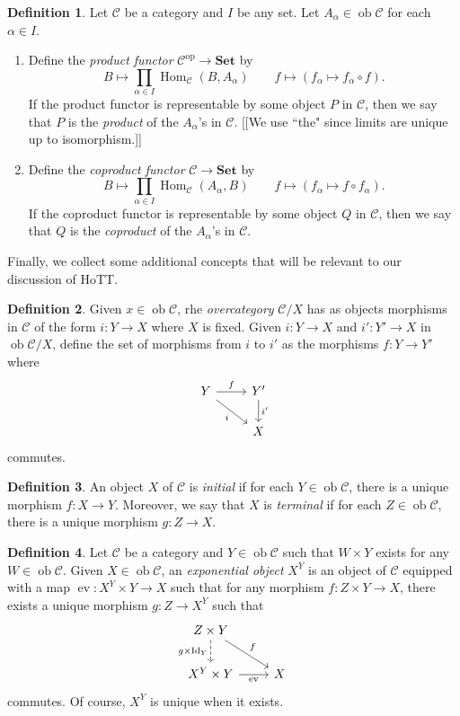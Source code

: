 \documentclass[10pt,letterpaper,cm]{nupset}
\theoremstyle{definition}
\newtheorem{definition}{Definition}[subsection]
\theoremstyle{theorem}
\theoremstyle{remark}
\newcommand{\1}{\mathbf{1}}
\renewcommand{\c}{\mathscr{C}}
\newcommand{\0}{\vec 0}
\DeclareMathOperator{\id}{Id}
\DeclareMathOperator{\op}{op}
\DeclareMathOperator{\ob}{ob}
\DeclareMathOperator{\ev}{ev}
\DeclareMathOperator{\Hom}{Hom}
\begin{document}
\begin{definition} Let $\c$ be a category and $I$ be any set. Let $A_{\alpha} \in \ob \c$ for each $\alpha \in I$.
\begin{enumerate}
\item  Define the \textit{product functor} $\c^{\op} \to \mathbf{Set}$ by $$B \mapsto \prod_{\alpha \in I}\Hom_{\c}(B, A_{\alpha}) \quad \quad f \mapsto (f_{\alpha} \mapsto f_{\alpha} \circ f).$$ If the product functor is representable by some object $P$ in $\c$, then we say that $P$ is the \textit{product} of the $A_{\alpha}$'s in $\c$. {[[We use ``the" since limits are unique up to isomorphism.]]}
\item Define the \textit{coproduct functor} $\c \to \mathbf{Set}$ by $$ B \mapsto \prod_{\alpha \in I} \Hom_{\c}(A_{\alpha}, B) \quad \quad f \mapsto (f_{\alpha} \mapsto f \circ f_{\alpha}).$$ If the coproduct functor is representable by some object $Q$ in $\c$, then we say that $Q$ is the \textit{coproduct} of the $A_{\alpha}$'s in $\c$.
\end{enumerate}
\end{definition}

Finally, we collect some additional concepts that will be relevant to our discussion of HoTT.

\begin{definition}
Given $x \in \ob \c$, rhe \textit{overcategory} ${\c}/{X}$ has as objects morphisms in $\c$ of the form $i : Y \to X$ where $X$ is fixed. Given $i:  Y \to X$ and  $i' : Y' \to X$ in $\ob {\c}/{X}$, define the set of morphisms from $i$ to $i'$ as the morphisms $f: Y \to Y'$ where
\[ \begin{tikzcd}
Y \arrow[r, "f"] \arrow[swap, dr,  " i "] & Y' \arrow[d, "i '"] \\%
 & X
\end{tikzcd}
\]
commutes.
\end{definition}

\begin{definition}
An object $X$ of $\c$ is \textit{initial} if for each $Y \in \ob \c$, there is a unique morphism $f : X \to Y$. Moreover, we say that $X$ is \textit{terminal} if for each $Z \in \ob \c$, there is a unique morphism $g : Z \to X$. 
\end{definition}

\begin{definition}
Let $\c$ be a category and $Y\in \ob{\c}$ such that $W\times Y$ exists for any $W\in \ob{\c}$. Given $X\in \ob{\c}$, an \textit{exponential object} $X^Y$ is an object of $\c$  equipped with a map $\ev : X^Y \times Y \to X$ such that for any morphism $f : Z\times Y \to X$, there exists a unique morphism $g: Z \to X^Y$ such that 
\[
\begin{tikzcd}
Z\times Y \arrow[d, "g\times \id_Y"', dashed] \arrow[rd, "f"] &  \\
X^Y \times Y \arrow[r, "\ev"'] & X
\end{tikzcd}
\] commutes. Of course, $X^Y$ is unique when it exists.
\end{definition}
\end{document}
